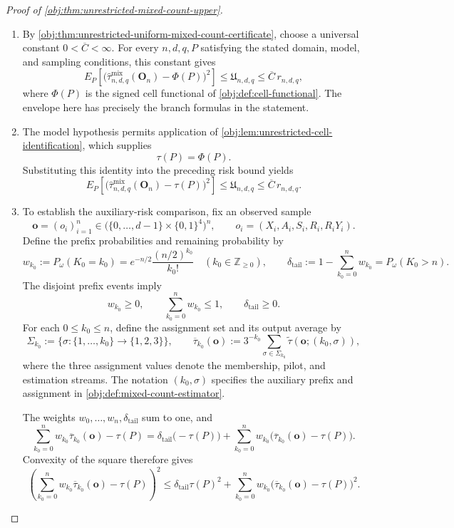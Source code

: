\begin{proof}[Proof of \cref{obj:thm:unrestricted-mixed-count-upper}]
\begin{enumerate}
\item By \cref{obj:thm:unrestricted-uniform-mixed-count-certificate}, choose a universal constant \(0<\overline C<\infty\). For every \(n,d,q,P\) satisfying the stated domain, model, and sampling conditions, this constant gives
\[
E_P\!\left[
 \bigl(\widehat\tau^{\mathrm{mix}}_{n,d,q}(\mathbf O_n)-\Phi(P)\bigr)^2
\right]
\le \mathfrak U_{n,d,q}
\le \overline C\,r_{n,d,q},
\]
where \(\Phi(P)\) is the signed cell functional of
\cref{obj:def:cell-functional}. The envelope here has precisely the branch formulas in the statement.

\item The model hypothesis permits application of
\cref{obj:lem:unrestricted-cell-identification}, which supplies
\[
\tau(P)=\Phi(P).
\]
Substituting this identity into the preceding risk bound yields
\[
E_P\!\left[
 \bigl(\widehat\tau^{\mathrm{mix}}_{n,d,q}(\mathbf O_n)-\tau(P)\bigr)^2
\right]
\le \mathfrak U_{n,d,q}
\le \overline C\,r_{n,d,q}.
\]

\item To establish the auxiliary-risk comparison, fix an observed sample
\[
\mathbf o=(o_i)_{i=1}^n
\in
\bigl(\{0,\ldots,d-1\}\times\{0,1\}^{4}\bigr)^n,
\qquad
o_i=(X_i,A_i,S_i,R_i,R_iY_i).
\]
Define the prefix probabilities and remaining probability by
\[
w_{k_0}:=P_\omega(K_0=k_0)
=e^{-n/2}\frac{(n/2)^{k_0}}{k_0!}
\quad(k_0\in\mathbb Z_{\ge0}),
\qquad
\delta_{\mathrm{tail}}
:=1-\sum_{k_0=0}^{n}w_{k_0}
=P_\omega(K_0>n).
\]
The disjoint prefix events imply
\[
w_{k_0}\ge0,\qquad
\sum_{k_0=0}^{n}w_{k_0}\le1,\qquad
\delta_{\mathrm{tail}}\ge0.
\]
For each \(0\le k_0\le n\), define the assignment set and its output average by
\[
\Sigma_{k_0}
:=\bigl\{\sigma:\{1,\ldots,k_0\}\to\{1,2,3\}\bigr\},
\qquad
\overline\tau_{k_0}(\mathbf o)
:=3^{-k_0}\sum_{\sigma\in\Sigma_{k_0}}
 \widetilde\tau(\mathbf o;(k_0,\sigma)),
\]
where the three assignment values denote the membership, pilot, and estimation streams. The notation \((k_0,\sigma)\) specifies the auxiliary prefix and assignment in \cref{obj:def:mixed-count-estimator}.

The weights \(w_0,\ldots,w_n,\delta_{\mathrm{tail}}\) sum to one, and
\[
\sum_{k_0=0}^{n}w_{k_0}\overline\tau_{k_0}(\mathbf o)-\tau(P)
=
\delta_{\mathrm{tail}}\bigl(-\tau(P)\bigr)
+\sum_{k_0=0}^{n}w_{k_0}
 \bigl(\overline\tau_{k_0}(\mathbf o)-\tau(P)\bigr).
\]
Convexity of the square therefore gives
\[
\left(
 \sum_{k_0=0}^{n}w_{k_0}\overline\tau_{k_0}(\mathbf o)-\tau(P)
\right)^2
\le
\delta_{\mathrm{tail}}\tau(P)^2
+\sum_{k_0=0}^{n}w_{k_0}
 \bigl(\overline\tau_{k_0}(\mathbf o)-\tau(P)\bigr)^2.
\]


\end{enumerate}
\end{proof}
